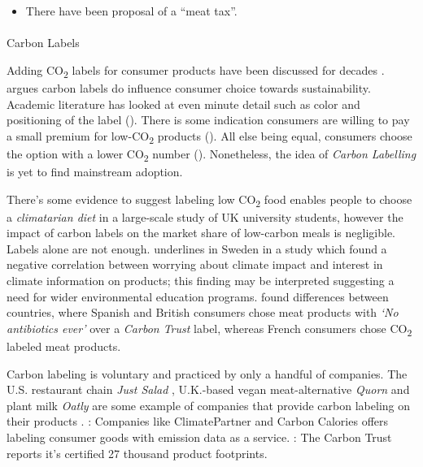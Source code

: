 \documentclass[
  letterpaper,
  DIV=11,
  numbers=noendperiod]{scrartcl}
\makeatletter
\let\oldparagraph\paragraph
\renewcommand{\paragraph}{
    \@ifstar
      \xxxParagraphStar
      \xxxParagraphNoStar
  }
\newcommand{\xxxParagraphStar}[1]{\oldparagraph*{#1}\mbox{}}
\newcommand{\xxxParagraphNoStar}[1]{\oldparagraph{#1}\mbox{}}
\providecommand{\tightlist}{%
  \setlength{\itemsep}{0pt}\setlength{\parskip}{0pt}}\usepackage{longtable,booktabs,array}
\makeatother
\begin{document}
\begin{itemize}
\tightlist
\item
  There have been proposal of a ``meat tax''.
\end{itemize}

\paragraph{Carbon Labels}\label{carbon-labels}

Adding CO\textsubscript{2} labels for consumer products have been
discussed for decades \citep{adamcornerWhyWeNeed2012}.
\citet{cohenPotentialRoleCarbon2012} argues carbon labels do influence
consumer choice towards sustainability. Academic literature has looked
at even minute detail such as color and positioning of the label
(\citet{zhouCarbonLabelsHorizontal2019}). There is some indication
consumers are willing to pay a small premium for low-CO\textsubscript{2}
products (\citet{xuLowcarbonEconomyCarbon2022}). All else being equal,
consumers choose the option with a lower CO\textsubscript{2} number
(\citet{carlssonSustainableFoodCan2022}). Nonetheless, the idea of
\emph{Carbon Labelling} is yet to find mainstream adoption.

There's some evidence to suggest labeling low CO\textsubscript{2} food
enables people to choose a \emph{climatarian diet} in a large-scale
study \citet{lohmannCarbonFootprintLabels2022} of UK university
students, however the impact of carbon labels on the market share of
low-carbon meals is negligible. Labels alone are not enough. underlines
\citet{edenbrandtConsumerPerceptionsAttitudes2022} in Sweden in a study
which found a negative correlation between worrying about climate impact
and interest in climate information on products; this finding may be
interpreted suggesting a need for wider environmental education
programs. \citet{asioliConsumersValuationCultured2022} found differences
between countries, where Spanish and British consumers chose meat
products with \emph{`No antibiotics ever'} over a \emph{Carbon Trust}
label, whereas French consumers chose CO\textsubscript{2} labeled meat
products.

Carbon labeling is voluntary and practiced by only a handful of
companies. The U.S. restaurant chain \emph{Just Salad} , U.K.-based
vegan meat-alternative \emph{Quorn} and plant milk \emph{Oatly} are some
example of companies that provide carbon labeling on their products
\citep{briankatemanCarbonLabelsAre2020}.
\citet{climatepartnerLabellingCarbonFootprint2020}: Companies like
ClimatePartner and Carbon Calories offers labeling consumer goods with
emission data as a service. \citet{thecarbontrustHowReduceYour}: The
Carbon Trust reports it's certified 27 thousand product footprints.
\end{document}
